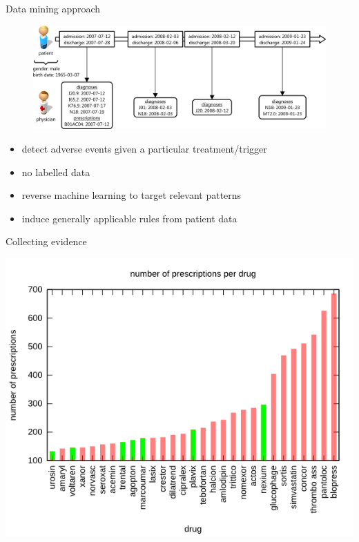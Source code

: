 \documentclass{beamer}
\begin{document}
\begin{frame}{Data mining approach}


 \begin{minipage}{\textwidth}
\begin{figure}
\includegraphics[width=\textwidth,keepaspectratio]{timeline_final2}
\end{figure}
  \end{minipage}
  \vfill
  \begin{minipage}{\textwidth}
\begin{itemize}
\item detect adverse events given a particular treatment/trigger \pause
\item no labelled data \pause
\item reverse machine learning to target relevant patterns \pause
\item induce generally applicable rules from patient data
\end{itemize}
\end{minipage}
\end{frame}

\begin{frame}{Collecting evidence}
\begin{table}[!ht]  
\includegraphics[width=\textwidth,height=.88\textheight,keepaspectratio]{plot_drug_prescriptions}
\end{table}
\end{frame}
\end{document}
